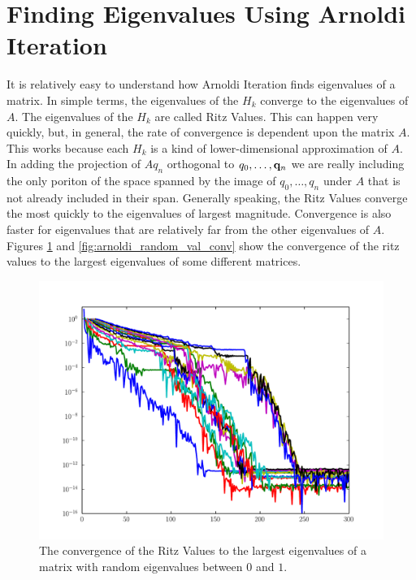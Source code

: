 
\section*{Finding Eigenvalues Using Arnoldi Iteration}

It is relatively easy to understand how Arnoldi Iteration finds eigenvalues of a matrix.
In simple terms, the eigenvalues of the $H_k$ converge to the eigenvalues of $A$.
The eigenvalues of the $H_k$ are called Ritz Values.
This can happen very quickly, but, in general, the rate of convergence is dependent upon the matrix $A$.
This works because each $H_k$ is a kind of lower-dimensional approximation of $A$.
In adding the projection of $A q_n$ orthogonal to $q_0, \dots, {\bf q}_n$ we are really including the only poriton of the space spanned by the image of $q_0, \dots, q_n$ under $A$ that is not already included in their span.
Generally speaking, the Ritz Values converge the most quickly to the eigenvalues of largest magnitude.
Convergence is also faster for eigenvalues that are relatively far from the other eigenvalues of $A$.
Figures \ref{fig:arnoldi_random_eig_conv} and \ref{fig:arnoldi_random_val_conv} show the convergence of the ritz values to the largest eigenvalues of some different matrices.

\begin{figure}
\includegraphics[width=\textwidth]{rand_eigs_conv.pdf}
\caption{The convergence of the Ritz Values to the largest eigenvalues of a matrix with random eigenvalues between $0$ and $1$.}
\label{fig:arnoldi_random_eig_conv}
\end{figure}

